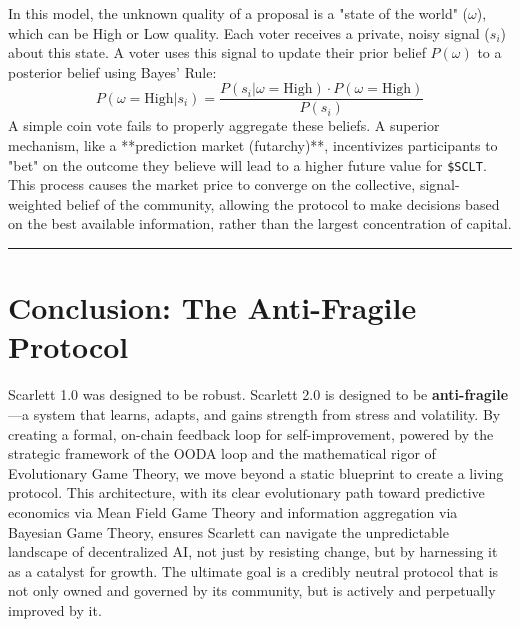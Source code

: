 \documentclass[10pt]{article}
\begin{document}
In this model, the unknown quality of a proposal is a "state of the world" (\(\omega\)), which can be High or Low quality. Each voter receives a private, noisy signal (\(s_i\)) about this state. A voter uses this signal to update their prior belief \(P(\omega)\) to a posterior belief using Bayes' Rule:
\[ P(\omega=\text{High} | s_i) = \frac{P(s_i | \omega=\text{High}) \cdot P(\omega=\text{High})}{P(s_i)} \]
A simple coin vote fails to properly aggregate these beliefs. A superior mechanism, like a **prediction market (futarchy)**, incentivizes participants to "bet" on the outcome they believe will lead to a higher future value for \texttt{\$SCLT}. This process causes the market price to converge on the collective, signal-weighted belief of the community, allowing the protocol to make decisions based on the best available information, rather than the largest concentration of capital.

\hrule
\newpage
\section{Conclusion: The Anti-Fragile Protocol}
Scarlett 1.0 was designed to be robust. Scarlett 2.0 is designed to be \textbf{anti-fragile}—a system that learns, adapts, and gains strength from stress and volatility. By creating a formal, on-chain feedback loop for self-improvement, powered by the strategic framework of the OODA loop and the mathematical rigor of Evolutionary Game Theory, we move beyond a static blueprint to create a living protocol. This architecture, with its clear evolutionary path toward predictive economics via Mean Field Game Theory and information aggregation via Bayesian Game Theory, ensures Scarlett can navigate the unpredictable landscape of decentralized AI, not just by resisting change, but by harnessing it as a catalyst for growth. The ultimate goal is a credibly neutral protocol that is not only owned and governed by its community, but is actively and perpetually improved by it.
\end{document}
